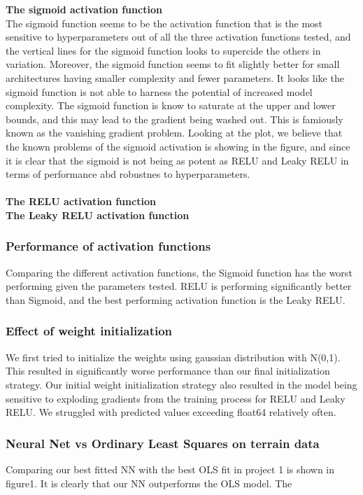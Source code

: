 \documentclass
[twocolumn,
secnumarabic,
nobibnotes,
aps,
prl,
reprint,
groupedaddress,
amsmath,
amssymb
]{revtex4-2}
\begin{document}
\textbf{The sigmoid activation function}\\
The sigmoid function seems to be the activation function that is the most sensitive to hyperparameters out of all the three activation functions tested, and the vertical lines for the sigmoid function looks to supercide the others in variation. Moreover, the sigmoid function seems to fit slightly better for small architectures having smaller complexity and fewer parameters. It looks like the sigmoid function is not able to harness the potential of increased model complexity. The sigmoid function is know to saturate at the upper and lower bounds, and this may lead to the gradient being washed out. This is famiously known as the vanishing gradient problem. Looking at the plot, we believe that the known problems of the sigmoid activation is showing in the figure, and since it is clear that the sigmoid is not being as potent as RELU and Leaky RELU in terms of performance abd robustnes to hyperparameters.\\\\

\textbf{The RELU activation function}\\


\textbf{The Leaky RELU activation function}\\



\subsubsection{Performance of activation functions}
Comparing the different activation functions, the Sigmoid function has the worst performing given the parameters tested. RELU is performing significantly better than Sigmoid, and the best performing activation function is the Leaky RELU.

\subsubsection{Effect of weight initialization}
We first tried to initialize the weights using gaussian distribution with N(0,1). This resulted in significantly worse performance than our final initialization strategy. Our initial weight initialization strategy also resulted in the model being sensitive to exploding gradients from the training process for RELU and Leaky RELU. We struggled with predicted values exceeding float64 relatively often.


\subsubsection{Neural Net vs Ordinary Least Squares on terrain data}
Comparing our best fitted NN with the best OLS fit in project 1 is shown in figure1. It is clearly that our NN outperforms the OLS model. The
\end{document}
